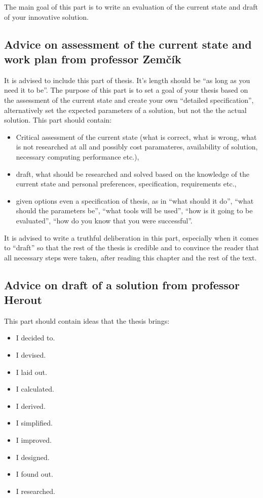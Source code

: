 The main goal of this part is to write an evaluation of the current state and draft of your innovative solution.

\subsection*{Advice on assessment of the current state and work plan from professor Zemčík}

It is advised to include this part of thesis. It's length should be ``as long as you need it to be''. The purpose of this part is to set a goal of your thesis based on the assessment of the current state and create your own ``detailed specification'', alternatively set the expected parameters of a solution, but not the the actual solution. This part should contain:
\begin{itemize}
  \item{Critical assessment of the current state (what is correct, what is wrong, what is not researched at all and possibly cost paramateres, availability of solution, necessary computing performance etc.),}
  \item{draft, what should be researched and solved based on the knowledge of the current state and personal preferences, specification, requirements etc.,}
  \item{given options even a specification of thesis, as in ``what should it do'', ``what should the parameters be'', ``what tools will be used'', ``how is it going to be evaluated'', ``how do you know that you were successful''.}
\end{itemize}
It is advised to write a truthful deliberation in this part, especially when it comes to ``draft'' so that the rest of the thesis is credible and to convince the reader that all necessary steps were taken, after reading this chapter and the rest of the text.


\subsection*{Advice on draft of a solution from professor Herout}

This part should contain ideas that the thesis brings:
\begin{itemize}
  \item{I decided to.}
  \item{I devised.}
  \item{I laid out.}
  \item{I calculated.}
  \item{I derived.}
  \item{I simplified.}
  \item{I improved.}
  \item{I designed.}
  \item{I found out.}
  \item{I researched.}
\end{itemize}

